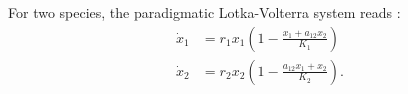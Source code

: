 \documentclass[a4paper,10pt]{article}
\numberwithin{equation}{section} %
\begin{document}
For two species, the paradigmatic Lotka-Volterra system reads \cite{Chotibut2015,MacArthur1970,Dobrinevski2012,Constable2015,Bomze1983,Levin1970,Czuppon2017}: %
\begin{equation}
\begin{aligned}
 \dot{x}_1 &= r_1 x_1 \left( 1 - \frac{x_1 + a_{12} x_2}{K_1} \right) \\
 \dot{x}_2 &= r_2 x_2 \left( 1 - \frac{a_{12} x_1 + x_2}{K_2} \right).
\end{aligned} \label{mean-field-eqns}
\end{equation}
\end{document}
